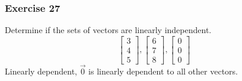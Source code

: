 \documentclass{math}
\begin{document}
\subsubsection*{Exercise 27}
Determine if the sets of vectors are linearly independent.
\[ \begin{bmatrix}3 \\ 4 \\ 5\end{bmatrix},
  \begin{bmatrix}6 \\ 7 \\ 8\end{bmatrix},
  \begin{bmatrix}0 \\ 0 \\ 0\end{bmatrix} \]
Linearly dependent, \( \vec{0} \) is linearly dependent to all other vectors.
\end{document}
